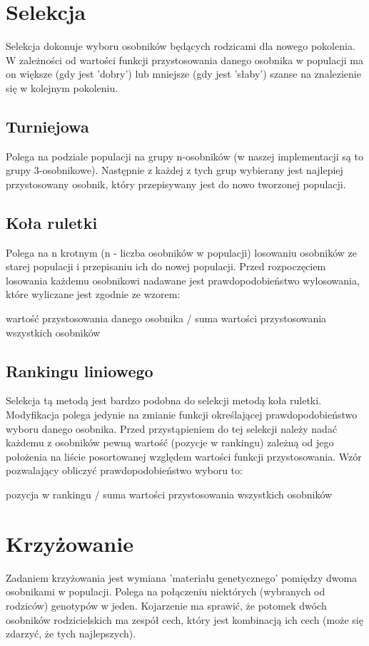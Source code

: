 \documentclass[11pt]{aghdpl}
\begin{document}
\chapter{Selekcja}
\label{cha:selection}
Selekcja dokonuje wyboru osobników będących rodzicami dla nowego pokolenia.
W zależności od wartości funkcji przystosowania danego osobnika w populacji ma on większe (gdy jest 'dobry') lub mniejsze 
(gdy jest 'słaby') szanse na znalezienie się w kolejnym pokoleniu. 
\section{Turniejowa}
\label{sec:tournament}
Polega na podziale populacji na grupy n-osobników (w naszej implementacji są to grupy 3-osobnikowe). Następnie z każdej z 
tych grup wybierany jest najlepiej przystosowany osobnik, który przepisywany jest do nowo tworzonej populacji.

\section{Koła ruletki}
\label{sec:roulette}
Polega na n krotnym (n - liczba osobników w populacji) losowaniu osobników ze starej populacji i przepisaniu ich do nowej 
populacji. Przed rozpoczęciem losowania każdemu osobnikowi nadawane jest prawdopodobieństwo wylosowania, które wyliczane 
jest zgodnie ze wzorem:
\begin{center}
wartość przystosowania danego osobnika / suma wartości przystosowania wszystkich osobników
\end{center}
 
\section{Rankingu liniowego}
\label{sec:linear}
Selekcja tą metodą jest bardzo podobna do selekcji metodą koła ruletki. Modyfikacja polega jedynie na zmianie funkcji 
określającej prawdopodobieństwo wyboru danego osobnika. Przed przystąpieniem do tej selekcji należy nadać każdemu z 
osobników pewną wartość (pozycje w rankingu) zależną od jego położenia na liście posortowanej względem wartości funkcji 
przystosowania. Wzór pozwalający obliczyć prawdopodobieństwo wyboru to:
\begin{center}
pozycja w rankingu / suma wartości przystosowania wszystkich osobników
\end{center}

\chapter{Krzyżowanie}
\label{cha:crossing}
Zadaniem krzyżowania jest wymiana 'materiału genetycznego' pomiędzy dwoma osobnikami w populacji. Polega na połączeniu 
niektórych (wybranych od rodziców) genotypów w jeden. Kojarzenie ma sprawić, że potomek dwóch osobników rodzicielskich 
ma zespół cech, który jest kombinacją ich cech (może się zdarzyć, że tych najlepszych). 
 
\end{document}
